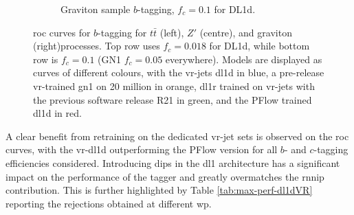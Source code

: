 \begin{figure}
\begin{subfigure}[t]{0.3\textwidth}
    \caption{Graviton sample $b$-tagging, $f_c = 0.1$ for DL1d.}
    \label{fig:dl1dVRROCgrc}
  \end{subfigure}
  \caption{\gls{roc} curves for $b$-tagging for $t\bar{t}$ (left), $Z'$ (centre), and graviton (right)processes. Top row uses $f_c = 0.018$ for DL1d, while bottom row is $f_c = 0.1$ (GN1 $f_c = 0.05$ everywhere). Models are displayed as curves of different colours, with the \gls{vr}-jets \gls{dl1d} in blue, a pre-release \gls{vr}-trained \gls{gn1} on 20 million in orange, \gls{dl1r} trained on \gls{vr}-jets with the previous software release R21 in green, and the PFlow trained \gls{dl1d} in red.}
  \label{fig:dl1dVRROC}
\end{figure}

A clear benefit from retraining on the dedicated \gls{vr}-jet sets is observed on the \gls{roc} curves, with the \gls{vr}-\gls{dl1d} outperforming the PFlow version for all $b$- and $c$-tagging efficiencies considered. Introducing \gls{dips} in the \gls{dl1} architecture has a significant impact on the performance of the tagger and greatly overmatches the \gls{rnnip} contribution. This is further highlighted by Table \ref{tab:max-perf-dl1dVR} reporting the rejections obtained at different \gls{wp}. 

